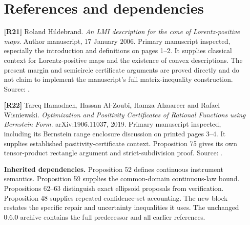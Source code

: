 \documentclass[11pt,letterpaper]{article}
\begin{document}
\begingroup
\small
\raggedright

\section{References and dependencies}\label{references-and-dependencies}

\textbf{{[}R21{]}} Roland Hildebrand. \emph{An LMI description for the
cone of Lorentz-positive maps}. Author manuscript, 17 January 2006.
Primary manuscript inspected, especially the introduction and
definitions on pages 1--2. It supplies classical context for
Lorentz-positive maps and the existence of convex descriptions. The
present margin and semicircle certificate arguments are proved directly
and do not claim to implement the manuscript's full matrix-inequality
construction. Source:
.

\textbf{{[}R22{]}} Tareq Hamadneh, Hassan Al-Zoubi, Hamza Alzaareer and
Rafael Wisniewski. \emph{Optimization and Positivity Certificates of
Rational Functions using Bernstein Form}. arXiv:1906.11037, 2019.
Primary manuscript inspected, including its Bernstein range enclosure
discussion on printed pages 3--4. It supplies established
positivity-certificate context. Proposition 75 gives its own
tensor-product rectangle argument and strict-subdivision proof. Source:
.

\textbf{Inherited dependencies.} Proposition 52 defines continuous
instrument semantics. Proposition 59 supplies the common-domain
continuous-law bound. Propositions 62--63 distinguish exact ellipsoid
proposals from verification. Proposition 48 supplies repeated
confidence-set accounting. The new block restates the specific repair
and uncertainty inequalities it uses. The unchanged 0.6.0 archive
contains the full predecessor and all earlier references.

\endgroup
\end{document}
